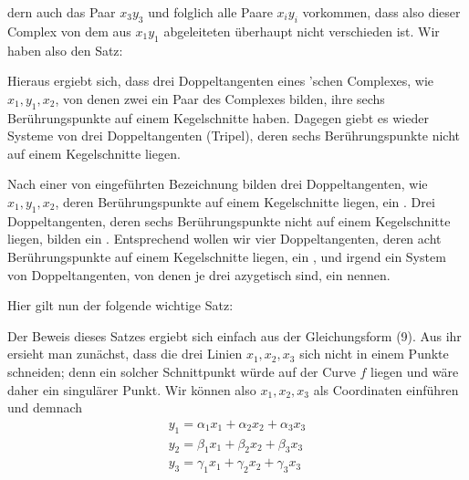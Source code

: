 dern auch das Paar $x_3 y_3$ und folglich alle Paare $x_i y_i$ vorkommen, dass also dieser Complex von dem aus $x_1 y_1$ abgeleiteten überhaupt nicht verschieden ist. Wir haben also den Satz:


Hieraus ergiebt sich, dass drei Doppeltangenten eines 'schen Complexes, wie $x_1, y_1, x_2$, von denen zwei ein Paar des Complexes bilden, ihre sechs Berührungspunkte auf einem Kegelschnitte haben. Dagegen giebt es wieder Systeme von drei Doppeltangenten (Tripel), deren sechs Berührungspunkte nicht auf einem Kegelschnitte liegen.

Nach einer von  eingeführten Bezeichnung bilden drei Doppeltangenten, wie $x_1, y_1, x_2$, deren Berührungspunkte auf einem Kegelschnitte liegen, ein . Drei Doppeltangenten, deren sechs Berührungspunkte nicht auf einem Kegelschnitte liegen, bilden ein . Entsprechend wollen wir vier Doppeltangenten, deren acht Berührungspunkte auf einem Kegelschnitte liegen, ein , und irgend ein System von Doppeltangenten, von denen je drei azygetisch sind, ein  nennen.

Hier gilt nun der folgende wichtige Satz:


Der Beweis dieses Satzes ergiebt sich einfach aus der Gleichungsform (9). Aus ihr ersieht man zunächst, dass die drei Linien $x_1, x_2, x_3$ sich nicht in einem Punkte schneiden; denn ein solcher Schnittpunkt würde auf der Curve $f$ liegen und wäre daher ein singulärer Punkt. Wir können also $x_1, x_2, x_3$ als Coordinaten einführen und demnach
\[
\begin{gathered}
y_1 = \alpha_1 x_1 + \alpha_2 x_2 + \alpha_3 x_3\\
y_2 = \beta_1 x_1 + \beta_2 x_2 + \beta_3 x_3\\
y_3 = \gamma_1 x_1 + \gamma_2 x_2 + \gamma_3 x_3
\end{gathered}
\]
